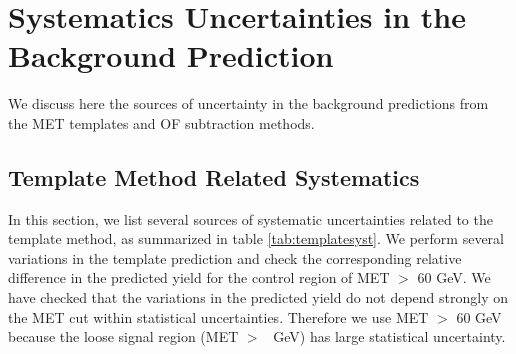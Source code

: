 \section{Systematics Uncertainties in the Background Prediction}
\label{sec:systematics}

We discuss here the sources of uncertainty in the background predictions from 
the MET templates and OF subtraction methods.

\subsection{Template Method Related Systematics}
\label{sec:systematicstemp}
In this section, we list several sources of systematic uncertainties related to the template method,
as summarized in table \ref{tab:templatesyst}. We perform several variations in the 
template prediction
and check the corresponding relative difference in the predicted yield for the 
control region of MET $>$ 60 GeV.
We have checked that the variations in the predicted yield do not depend strongly on the MET cut
within statistical uncertainties. 
Therefore we use MET $>$ 60 GeV because the loose signal region (MET $>$ \signalmetl~GeV) has
large statistical uncertainty.

